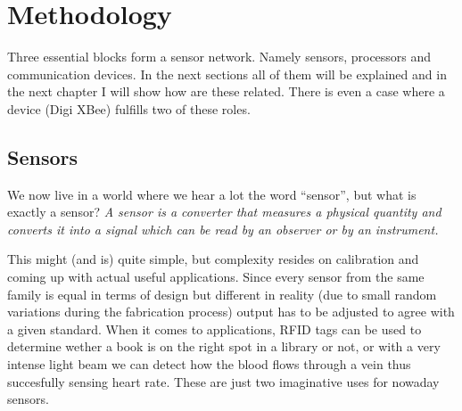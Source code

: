 
\chapter{Methodology} %

\label{Chapter3} %




Three essential blocks form a sensor network. Namely sensors, processors and communication devices\citep{chong2003sensor}. In the next sections all of them will be explained and in the next chapter I will show how are these related. There is even a case where a device (Digi XBee\textregistered) fulfills two of these roles.



\section{Sensors}

We now live in a world where we hear a lot the word ``sensor'', but what is exactly a sensor? \emph{A sensor is a converter that measures a physical quantity and converts it into a signal which can be read by an observer or by an instrument.}\citep{WikiSensor}

This might (and is) quite simple, but complexity resides on calibration and coming up with actual useful applications. Since every sensor from the same family is equal in terms of design but different in reality (due to small random variations during the fabrication process) output has to be adjusted to agree with a given standard. When it comes to applications, RFID tags can be used to determine wether a book is on the right spot in a library or not, or with a very intense light beam we can detect how the blood flows through a vein thus succesfully sensing heart rate. These are just two imaginative uses for nowaday sensors.

